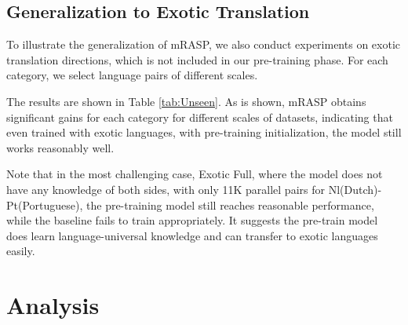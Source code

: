 \documentclass[11pt,a4paper]{article}
\newcommand{\method}{mRASP\xspace}
\begin{document}
\subsection{Generalization to Exotic Translation}

To illustrate the generalization of \method, we also conduct experiments on exotic translation directions, which is not included in our pre-training phase. 
For each category, we select language pairs of different scales.

The results are shown in Table \ref{tab:Unseen}. As is shown, \method obtains significant gains for each category for different scales of datasets, indicating that even trained with exotic languages, with pre-training initialization, the model still works reasonably well. 




Note that in the most challenging case, Exotic Full, where the model does not have any knowledge of both sides, with only 11K parallel pairs for Nl(Dutch)-Pt(Portuguese), the pre-training model still reaches reasonable performance, while the baseline fails to train appropriately. It suggests the pre-train model does learn language-universal knowledge and can transfer to exotic languages easily.
 
\section{Analysis}
\label{sec: analysis}
\end{document}
